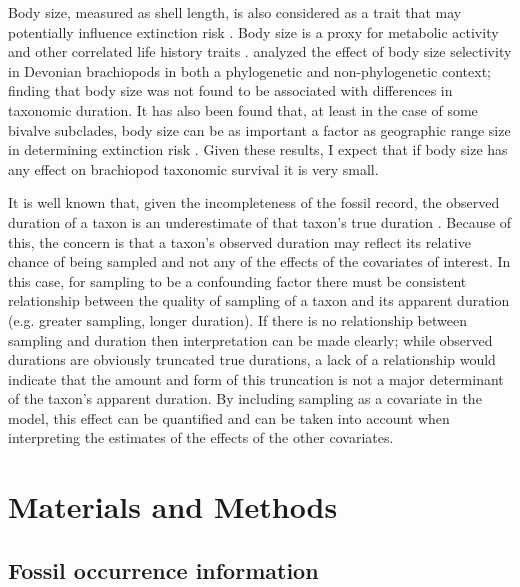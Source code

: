 \documentclass{article}
\begin{document}
Body size, measured as shell length, is also considered as a trait that may potentially influence extinction risk \citep{Payne2014,Harnik2011}. Body size is a proxy for metabolic activity and other correlated life history traits \citep{Payne2014}. \citet{Harnik2014} analyzed the effect of body size selectivity in Devonian brachiopods in both a phylogenetic and non-phylogenetic context; finding that body size was not found to be associated with differences in taxonomic duration. It has also been found that, at least in the case of some bivalve subclades, body size can be as important a factor as geographic range size in determining extinction risk \citep{Harnik2011}. Given these results, I expect that if body size has any effect on brachiopod taxonomic survival it is very small.

It is well known that, given the incompleteness of the fossil record, the observed duration of a taxon is an underestimate of that taxon's true duration \citep{Solow1997,Wagner2013a,Wang2004,Liow2010b,Alroy2014a,Foote1996e}. Because of this, the concern is that a taxon's observed duration may reflect its relative chance of being sampled and not any of the effects of the covariates of interest. In this case, for sampling to be a confounding factor there must be consistent relationship between the quality of sampling of a taxon and its apparent duration (e.g. greater sampling, longer duration). If there is no relationship between sampling and duration then interpretation can be made clearly; while observed durations are obviously truncated true durations, a lack of a relationship would indicate that the amount and form of this truncation is not a major determinant of the taxon's apparent duration. By including sampling as a covariate in the model, this effect can be quantified and can be taken into account when interpreting the estimates of the effects of the other covariates.



\section{Materials and Methods}

\subsection{Fossil occurrence information}
\end{document}
